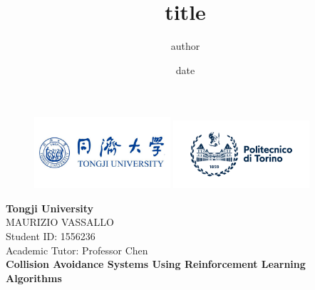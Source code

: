 \documentclass[14pt]{extarticle}
\def\ss{\vspace{25pt}}
\begin{document}
\title{title}
\author{author}
\date{date}

\begin{titlepage}
	\begin{figure}[t]
    		\centering\includegraphics[width=0.45\textwidth]{./Image/tongji-university1.png}
    		\centering\includegraphics[width=0.45\textwidth]{./Image/polito_logo_2021_blu_resized.png}
		\vspace{10mm}
	\end{figure}

	\begin{center}
	    	\textbf{ \LARGE{Tongji University\\}}
		\ss
		\textnormal{ \Large {MAURIZIO VASSALLO\\}}
		\textnormal{ \large {Student ID: 1556236\\}}
		\textnormal{ \large {Academic Tutor: Professor Chen\\}}
	    		\vspace{\fill}\textbf{\LARGE{Collision Avoidance Systems Using
Reinforcement Learning Algorithms\\}}\vspace*{\fill}%
	\end{center}
	
\end{titlepage}

\tableofcontents
\newpage
\end{document}

